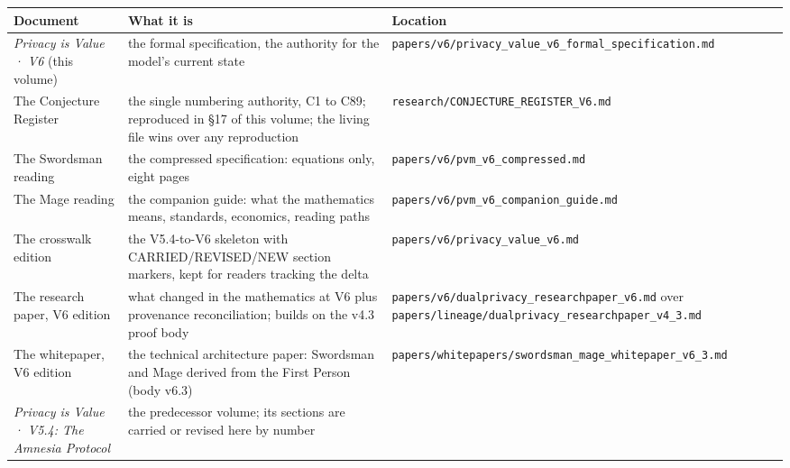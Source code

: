 \documentclass[
  11pt,
]{article}
\newcounter{none} %
\begin{document}
{\def\LTcaptype{none} %
\begin{longtable}[]{@{}
  >{\raggedright\arraybackslash}p{}
  >{\raggedright\arraybackslash}p{}
  >{\raggedright\arraybackslash}p{}@{}}
\toprule\noalign{}
\begin{minipage}[b]{\linewidth}\raggedright
Document
\end{minipage} & \begin{minipage}[b]{\linewidth}\raggedright
What it is
\end{minipage} & \begin{minipage}[b]{\linewidth}\raggedright
Location
\end{minipage} \\
\midrule\noalign{}
\endhead
\bottomrule\noalign{}
\endlastfoot
\emph{Privacy is Value · V6} (this volume) & the formal specification,
the authority for the model's current state &
\texttt{papers/v6/privacy\_value\_v6\_formal\_specification.md} \\
The Conjecture Register & the single numbering authority, C1 to C89;
reproduced in §17 of this volume; the living file wins over any
reproduction & \texttt{research/CONJECTURE\_REGISTER\_V6.md} \\
The Swordsman reading & the compressed specification: equations only,
eight pages & \texttt{papers/v6/pvm\_v6\_compressed.md} \\
The Mage reading & the companion guide: what the mathematics means,
standards, economics, reading paths &
\texttt{papers/v6/pvm\_v6\_companion\_guide.md} \\
The crosswalk edition & the V5.4-to-V6 skeleton with CARRIED/REVISED/NEW
section markers, kept for readers tracking the delta &
\texttt{papers/v6/privacy\_value\_v6.md} \\
The research paper, V6 edition & what changed in the mathematics at V6
plus provenance reconciliation; builds on the v4.3 proof body &
\texttt{papers/v6/dualprivacy\_researchpaper\_v6.md} over
\texttt{papers/lineage/dualprivacy\_researchpaper\_v4\_3.md} \\
The whitepaper, V6 edition & the technical architecture paper: Swordsman
and Mage derived from the First Person (body v6.3) &
\texttt{papers/whitepapers/swordsman\_mage\_whitepaper\_v6\_3.md} \\
\emph{Privacy is Value · V5.4: The Amnesia Protocol} & the predecessor
volume; its sections are carried or revised here by number &

\end{longtable}}
\end{document}
